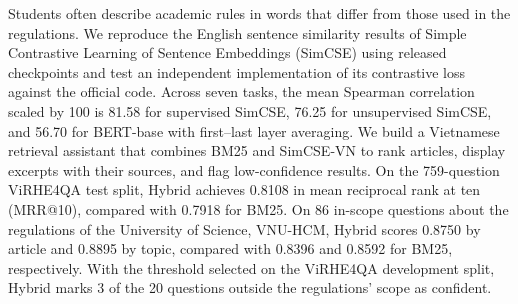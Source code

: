 Students often describe academic rules in words that differ from those used
in the regulations. We reproduce the English sentence similarity results of
Simple Contrastive Learning of Sentence Embeddings (SimCSE) using released
checkpoints and test an independent implementation of its contrastive loss
against the official code.
Across seven tasks, the mean Spearman correlation scaled by 100 is
81.58 for supervised SimCSE, %
76.25 for unsupervised SimCSE, and %
56.70 for BERT-base with first--last layer averaging. %
We build a Vietnamese retrieval assistant that combines BM25 and SimCSE-VN
to rank articles, display excerpts with their sources, and flag low-confidence
results.
On the 759-question ViRHE4QA test split, Hybrid achieves 0.8108 in mean
reciprocal rank at ten (MRR@10), compared with 0.7918 for BM25.
On 86 in-scope questions about the regulations of the University of Science,
VNU-HCM, Hybrid scores 0.8750 by article and 0.8895 by topic, compared with
0.8396 and 0.8592 for BM25, respectively.
With the threshold selected on the ViRHE4QA development split, Hybrid marks
3 of the 20 questions outside the regulations' scope as confident.
